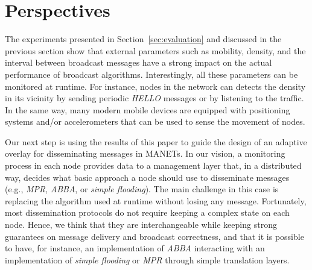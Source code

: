 
\section{Perspectives}
\label{sec:perspectives}

The experiments presented in Section~\ref{sec:evaluation} and discussed in the previous section show that external parameters such as mobility, density, and the interval between broadcast messages have a strong impact on the actual performance of broadcast algorithms.
%
Interestingly, all these parameters can be monitored at runtime.
%
For instance, nodes in the network can detects the density in its vicinity by sending periodic \textit{HELLO} messages or by listening to the traffic.
%
In the same way, many modern mobile devices are equipped with positioning systems and/or accelerometers that can be used to sense the movement of nodes.
%


Our next step is using the results of this paper to guide the design of an adaptive overlay for disseminating messages in MANETs.
%
In our vision, a monitoring process in each node provides data to a management layer that, in a distributed way, decides what basic approach a node should use to disseminate messages (e.g., \textit{MPR}, \textit{ABBA}, or \textit{simple flooding}).
%
The main challenge in this case is replacing the algorithm used at runtime without losing any message.
%
Fortunately, most dissemination protocols do not require keeping a complex state on each node.
%
Hence, we think that they are interchangeable while keeping strong guarantees on message delivery and broadcast correctness, and that it is possible to have, for instance, an implementation of \textit{ABBA} interacting with an implementation of \textit{simple flooding} or \textit{MPR} through simple translation layers.   



